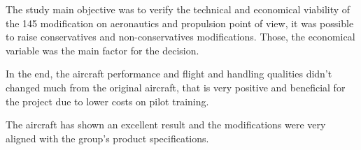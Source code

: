 The study main objective was to verify the technical and economical viability of the 145 modification on aeronautics and propulsion point of view, it was possible to raise conservatives and non-conservatives modifications. Those, the economical variable was the main factor for the decision.

In the end, the aircraft performance and flight and handling qualities didn't changed much from the original aircraft, that is very positive and beneficial for the project due to lower costs on pilot training.

The aircraft has shown an excellent result and the modifications were very aligned with the group's product specifications.